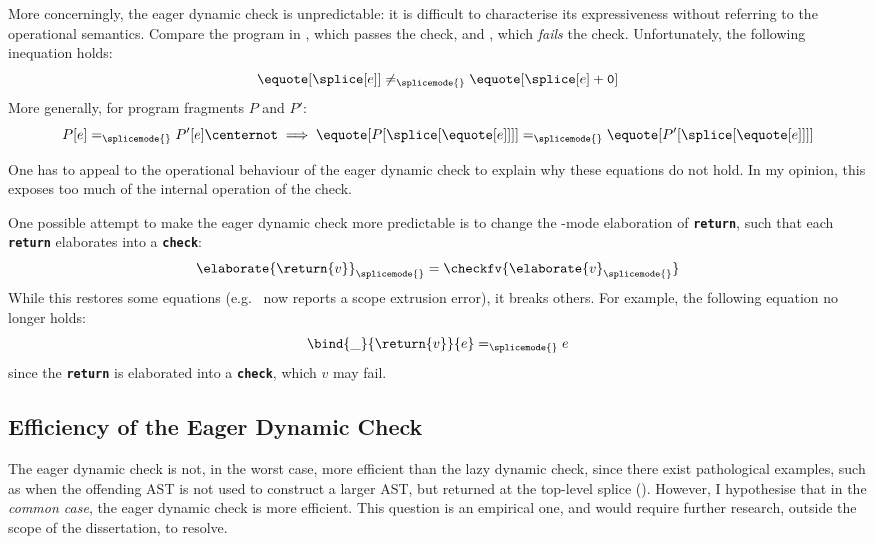 More concerningly, the eager dynamic check is unpredictable: it is difficult to characterise its expressiveness without referring to the operational semantics. Compare the program in , which passes the check, and , which \textit{fails} the check. Unfortunately, the following inequation holds:
\[\equote[\splice[e]] \neq_{\splicemode{}} \equote[{\splice[e] + \texttt{0}}]\]
More generally, for program fragments $P$ and $P'$:
\[P[e] =_{\splicemode{}} P'[e] \centernot\implies \equote[{P[\splice[{\equote[e]}]]}] =_{\splicemode{}} \equote[{P'[\splice[{\equote[e]}]]}]\]

One has to appeal to the operational behaviour of the eager dynamic check to explain why these equations do not hold. In my opinion, this exposes too much of the internal operation of the check. 

One possible attempt to make the eager dynamic check more predictable is to change the \splicemode{}-mode elaboration of \textbf{\texttt{return}}, such that each \textbf{\texttt{return}} elaborates into a \textbf{\texttt{check}}:
\[\elaborate{\return{v}}_{\splicemode{}} = \checkfv{\elaborate{v}_{\splicemode{}}}\]
While this restores some equations (e.g.\  now reports a scope extrusion error), it breaks others. For example, the following equation \citep{levy-2003} no longer holds:
\[\bind{\_}{\return{v}}{e} =_{\splicemode{}} e\]
since the \textbf{\texttt{return}} is elaborated into a \textbf{\texttt{check}}, which $v$ may fail.

\subsection{Efficiency of the Eager Dynamic Check}\label{subsection:eager-dynamic-efficiency}
The eager dynamic check is not, in the worst case, more efficient than the lazy dynamic check, since there exist pathological examples, such as when the offending AST is not used to construct a larger AST, but returned at the top-level splice (). However, I hypothesise that in the \textit{common case}, the eager dynamic check is more efficient. This question is an empirical one, and would require further research, outside the scope of the dissertation, to resolve. 

